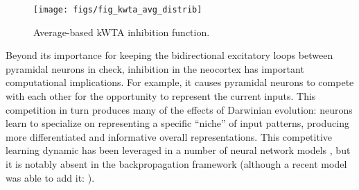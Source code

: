 \documentclass[11pt,twoside]{article}
\begin{document}
\begin{figure}
  \centering\texttt{[image: figs/fig\_kwta\_avg\_distrib]}
  \caption{\small Average-based kWTA inhibition function.}
  \label{fig.kwta_avg}
\end{figure}

Beyond its importance for keeping the bidirectional excitatory loops between pyramidal neurons in check, inhibition in the neocortex has important computational implications.  For example, it causes pyramidal neurons to compete with each other for the opportunity to represent the current inputs.  This competition in turn produces many of the effects of Darwinian evolution: neurons learn to specialize on representing a specific ``niche'' of input patterns, producing more differentiated and informative overall representations.  This competitive learning dynamic has been leveraged in a number of neural network models \cite{RumelhartZipser,Nowlan,Kohonen}, but it is notably absent in the backpropagation framework (although a recent model was able to add it: \cite{SaraLaslo}).
\end{document}
